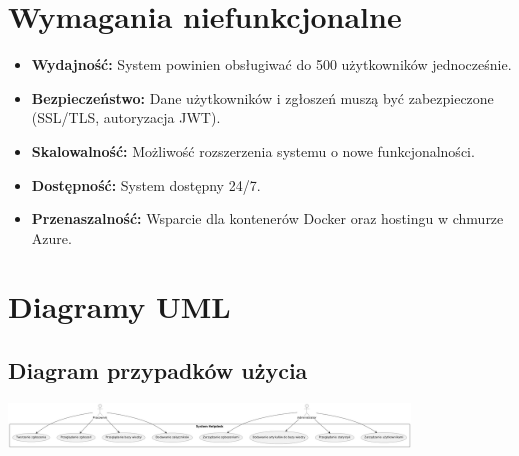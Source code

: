 \documentclass[a4paper,12pt]{article}
\begin{document}
\newpage

\section{Wymagania niefunkcjonalne}
\begin{itemize}
    \item \textbf{Wydajność:} System powinien obsługiwać do 500 użytkowników jednocześnie.
    \item \textbf{Bezpieczeństwo:} Dane użytkowników i zgłoszeń muszą być zabezpieczone (SSL/TLS, autoryzacja JWT).
    \item \textbf{Skalowalność:} Możliwość rozszerzenia systemu o nowe funkcjonalności.
    \item \textbf{Dostępność:} System dostępny 24/7.
    \item \textbf{Przenaszalność:} Wsparcie dla kontenerów Docker oraz hostingu w chmurze Azure.
\end{itemize}

\newpage

\section{Diagramy UML}

\subsection{Diagram przypadków użycia}
\begin{center}
\includegraphics[width=0.8\textwidth]{draw/diagramPU.png}
\end{center}
\end{document}
